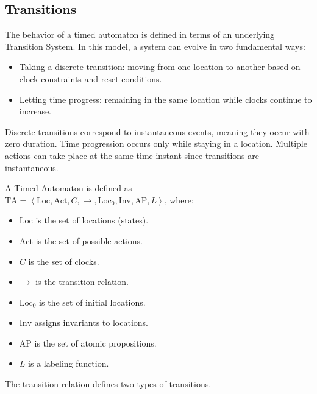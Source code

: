\subsection{Transitions}
The behavior of a timed automaton is defined in terms of an underlying Transition System. 
In this model, a system can evolve in two fundamental ways:
\begin{itemize}
    \item Taking a discrete transition: moving from one location to another based on clock constraints and reset conditions.
    \item Letting time progress: remaining in the same location while clocks continue to increase.
\end{itemize}
\noindent Discrete transitions correspond to instantaneous events, meaning they occur with zero duration.
Time progression occurs only while staying in a location.
Multiple actions can take place at the same time instant since transitions are instantaneous.
\begin{definition}
    A Timed Automaton is defined as \\ $\text{TA} = \left\langle \text{Loc}, \text{Act}, C, \rightarrow, \text{Loc}_0, \text{Inv}, \text{AP},L\right\rangle$, where: 
    \begin{itemize}
        \item $\text{Loc}$ is the set of locations (states).
        \item $\text{Act}$ is the set of possible actions.
        \item $C$ is the set of clocks.
        \item $\rightarrow$ is the transition relation.
        \item $\text{Loc}_0$ is the set of initial locations.
        \item $\text{Inv}$ assigns invariants to locations.
        \item $\text{AP}$ is the set of atomic propositions.
        \item $L$ is a labeling function.
    \end{itemize}
\end{definition}
\noindent The transition relation defines two types of transitions.

